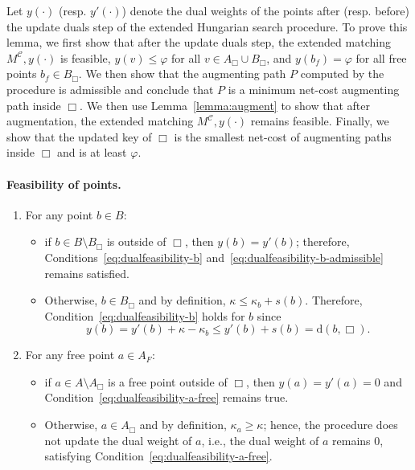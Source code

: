 \documentclass[11pt,onecolumn]{article}
\def\mcC{{\mathcal{C}}}
\newcommand{\cell}{\Box}
\newcommand{\distancetocell}[2]{\mathrm{d}(#1, #2)}
\newcommand{\ymax}{\varphi}
\newcommand\myparagraph[1]{\paragraph{#1}}
\begin{document}
\hungarianProp*
%
%
%



Let $y(\cdot)$ (resp. $y'(\cdot)$) denote the dual weights of the points after (resp. before) the update duals step of the extended Hungarian search procedure. To prove this lemma, we first show that after the update duals step, the extended matching $M^\mcC, y(\cdot)$ is feasible, $y(v)\le \ymax$ for all $v\in A_\cell\cup B_\cell$, and $y(b_f)=\ymax$ for all free points $b_f\in B_\cell$. We then show that the augmenting path $P$ computed by the procedure is admissible and conclude that $P$ is a minimum net-cost augmenting path inside $\cell$. We then use Lemma~\ref{lemma:augment} to show that after augmentation, the extended matching $M^\mcC, y(\cdot)$ remains feasible. Finally, we show that the updated key of $\cell$ is the smallest net-cost of augmenting paths inside $\cell$ and is at least $\ymax$.

    \myparagraph{Feasibility of points.}
    \begin{enumerate}
        \item For any point $b\in B$:
        \begin{itemize}
            \item if $b\in B\setminus B_\cell$ is outside of $\cell$, then $y(b)=y'(b)$; therefore, Conditions~\eqref{eq:dualfeasibility-b} and~\eqref{eq:dualfeasibility-b-admissible} remains satisfied.
            \item Otherwise, $b\in B_\cell$ and by definition, $\kappa\le \kappa_b+s(b)$. Therefore, Condition~\eqref{eq:dualfeasibility-b} holds for $b$ since 
            \begin{equation}\label{eq:global-hung-2}
                y(b) = y'(b) + \kappa - \kappa_b \le y'(b) + s(b) =\distancetocell{b}{\cell}. 
            \end{equation}
        \end{itemize}
        \item For any free point $a\in A_F$:
        \begin{itemize}
            \item if $a\in A\setminus A_\cell$ is a free point outside of $\cell$, then $y(a)=y'(a)=0$ and Condition~\eqref{eq:dualfeasibility-a-free} remains true. 
            \item Otherwise, $a\in A_\cell$ and by definition, $\kappa_a\ge \kappa$; hence, the procedure does not update the dual weight of $a$, i.e., the dual weight of $a$ remains $0$, satisfying Condition~\eqref{eq:dualfeasibility-a-free}. 
        \end{itemize}
        
    \end{enumerate}
\end{document}
